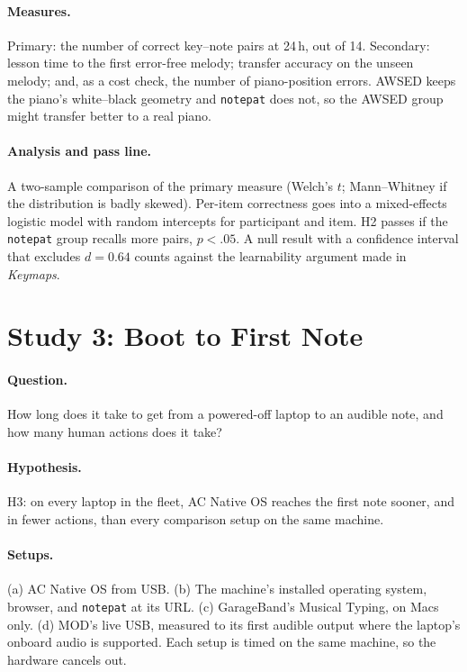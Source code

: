 \documentclass[10pt,letterpaper,twocolumn]{article}
\newcommand{\acos}{AC Native OS}
\newcommand{\np}{\texttt{notepat}}
\begin{document}
\paragraph{Measures.} Primary: the number of correct key--note pairs at 24\,h, out of 14. Secondary: lesson time to the first error-free melody; transfer accuracy on the unseen melody; and, as a cost check, the number of piano-position errors. AWSED keeps the piano's white--black geometry and \np{} does not, so the AWSED group might transfer better to a real piano.

\paragraph{Analysis and pass line.} A two-sample comparison of the primary measure (Welch's $t$; Mann--Whitney if the distribution is badly skewed). Per-item correctness goes into a mixed-effects logistic model with random intercepts for participant and item. H2 passes if the \np{} group recalls more pairs, $p < .05$. A null result with a confidence interval that excludes $d = 0.64$ counts against the learnability argument made in \emph{Keymaps}.

\section{Study 3: Boot to First Note}
\label{sec:s3}

\paragraph{Question.} How long does it take to get from a powered-off laptop to an audible note, and how many human actions does it take?

\paragraph{Hypothesis.} H3: on every laptop in the fleet, \acos{} reaches the first note sooner, and in fewer actions, than every comparison setup on the same machine.

\paragraph{Setups.} (a) \acos{} from USB. (b) The machine's installed operating system, browser, and \np{} at its URL. (c) GarageBand's Musical Typing, on Macs only. (d) MOD's live USB, measured to its first audible output where the laptop's onboard audio is supported. Each setup is timed on the same machine, so the hardware cancels out.
\end{document}
